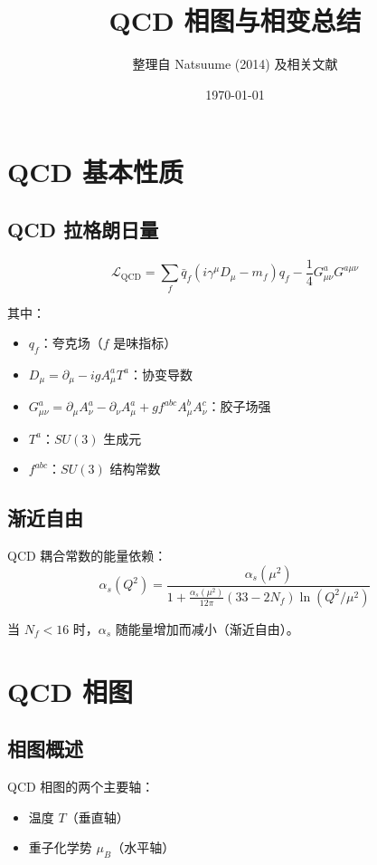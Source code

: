 \documentclass[12pt,a4paper]{ctexart}
\title{QCD 相图与相变总结}
\author{整理自 Natsuume (2014) 及相关文献}
\date{\today}
\begin{document}
\maketitle

\section{QCD 基本性质}

\subsection{QCD 拉格朗日量}
\begin{equation}
    \mathcal{L}_{\text{QCD}} = \sum_f \bar{q}_f (i\gamma^\mu D_\mu - m_f) q_f
    - \frac{1}{4} G_{\mu\nu}^a G^{a\mu\nu}
\end{equation}

其中：
\begin{itemize}
    \item $q_f$：夸克场（$f$ 是味指标）
    \item $D_\mu = \partial_\mu - ig A_\mu^a T^a$：协变导数
    \item $G_{\mu\nu}^a = \partial_\mu A_\nu^a - \partial_\nu A_\mu^a + g f^{abc} A_\mu^b A_\nu^c$：胶子场强
    \item $T^a$：$SU(3)$ 生成元
    \item $f^{abc}$：$SU(3)$ 结构常数
\end{itemize}

\subsection{渐近自由}

QCD 耦合常数的能量依赖：
\begin{equation}
    \alpha_s(Q^2) = \frac{\alpha_s(\mu^2)}{1 + \frac{\alpha_s(\mu^2)}{12\pi} (33 - 2N_f) \ln(Q^2/\mu^2)}
\end{equation}

当 $N_f < 16$ 时，$\alpha_s$ 随能量增加而减小（渐近自由）。

\section{QCD 相图}

\subsection{相图概述}

QCD 相图的两个主要轴：
\begin{itemize}
    \item 温度 $T$（垂直轴）
    \item 重子化学势 $\mu_B$（水平轴）
\end{itemize}
\end{document}
